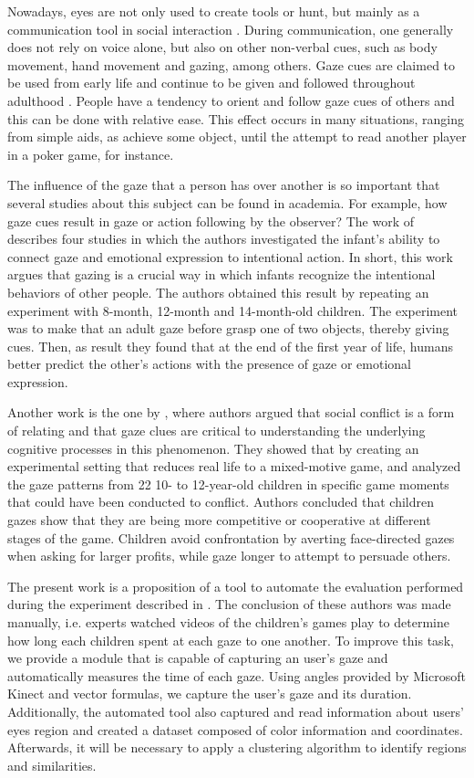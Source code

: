 \documentclass[10pt, conference]{IEEEtran}
\begin{document}
	Nowadays, eyes are not only used to create tools or hunt, but mainly as a communication tool in social interaction \cite{4}.
	During communication, one generally does not rely on voice alone, but also on other non-verbal cues, such as body movement, hand movement and gazing, among others.
	Gaze cues are claimed to be used from early life and continue to be given and followed throughout adulthood \cite{4}.
	People have a tendency to orient and follow gaze cues of others and this can be done with relative ease.
	This effect occurs in many situations, ranging from simple aids, as achieve some object, until the attempt to read another player in a poker game, for instance.

	The influence of the gaze that a person has over another is so important that several studies about this subject can be found in academia.
	For example, how gaze cues result in gaze or action following by the observer? 
	The work of \cite{5} describes four studies in which the authors investigated the infant's ability to connect gaze and emotional expression to intentional action.
	In short, this work argues that gazing is a crucial way in which infants recognize the intentional behaviors of other people. 
	The authors obtained this result by repeating an experiment with 8-month, 12-month and 14-month-old children. 
	The experiment was to make that an adult gaze before grasp one of two objects, thereby giving cues. 
	Then, as result they found that at the end of the first year of life, humans better predict the other's actions with the presence of gaze or emotional expression.
    
	Another work is the one by \cite{6}, where authors argued that social conflict is a form of relating and that gaze clues are critical to understanding the underlying cognitive processes in this phenomenon. 
	They showed that by creating an experimental setting that reduces real life to a mixed-motive game, and analyzed the gaze patterns from 22 10- to 12-year-old children in specific game moments that could have been conducted to conflict.
	Authors concluded that children gazes show that they are being more competitive or cooperative at different stages of the game.
	Children avoid confrontation by averting face-directed gazes when asking for larger profits, while gaze longer to attempt to persuade others.

	The present work is a proposition of a tool to automate the evaluation performed during the experiment described in \cite{6}.
	The conclusion of these authors was made manually, i.e. experts watched videos of the children's games play to determine how long each children spent at each gaze to one another.
	To improve this task, we provide a module that is capable of capturing an user's gaze and automatically measures the time of each gaze.
	Using angles provided by Microsoft Kinect and vector formulas, we capture the user's gaze and its duration.
	Additionally, the automated tool also captured and read information about users' eyes region and created a dataset composed of color information and coordinates.
	Afterwards, it will be necessary to apply a clustering algorithm to identify regions and similarities. 
\end{document}
